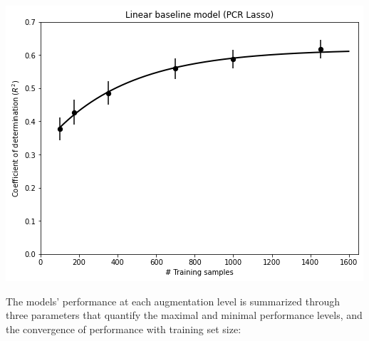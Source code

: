 \documentclass[a0paper,landscape,fontscale=0.365]{baposter}
\newenvironment{Figure}
  {\par\medskip\noindent\minipage{\linewidth}}
  {\endminipage\par\medskip}
\begin{document}
\begin{poster}
{\begin{multicols}{4}
    \columnbreak
    \begin{Figure}
        \centering
        \includegraphics[width=1.0\linewidth]{figures/curves_pcrlasso}
    \end{Figure}
    \columnbreak

\end{multicols}

The models' performance at each augmentation level is summarized through three parameters that quantify the maximal and minimal performance levels, and the convergence of performance with training set size:

}
\end{poster}
\end{document}
